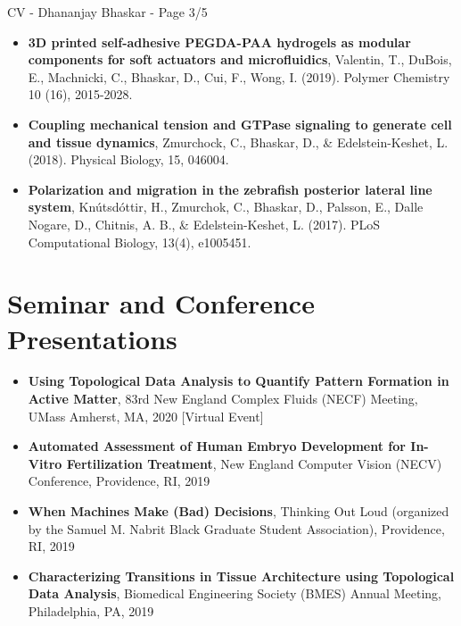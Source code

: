 \documentclass[margin,line]{res}
\begin{document}
\begin{resume}
\newpage
\begin{flushright}
CV - Dhananjay Bhaskar - Page 3/5
\end{flushright}
\vspace*{.2cm}

{\renewcommand\leftmargini{0em}
\begin{itemize}
\item{\bf 3D printed self-adhesive PEGDA-PAA hydrogels as modular components for soft actuators and microfluidics}, Valentin, T., DuBois, E., Machnicki, C., Bhaskar, D., Cui, F., Wong, I. (2019). Polymer Chemistry 10 (16), 2015-2028.
\vspace*{.1cm}
\item {\bf Coupling mechanical tension and GTPase signaling to generate cell and tissue dynamics}, Zmurchock, C., Bhaskar, D., \& Edelstein-Keshet, L. (2018). Physical Biology, 15, 046004.
\vspace*{.1cm}
\item{\bf Polarization and migration in the zebrafish posterior lateral line system}, Kn\'{u}tsd\'{o}ttir, H., Zmurchok, C., Bhaskar, D., Palsson, E., Dalle Nogare, D., Chitnis, A. B., \& Edelstein-Keshet, L. (2017). PLoS Computational Biology, 13(4), e1005451.
\end{itemize}
}

\vspace*{.3cm}

\section{\sc Seminar and Conference Presentations}

{\renewcommand\leftmargini{0em}
\begin{itemize}
\item {\bf Using Topological Data Analysis to Quantify Pattern Formation in Active Matter}, 83rd New England Complex Fluids (NECF) Meeting, UMass Amherst, MA, 2020 [Virtual Event]

\item {\bf Automated Assessment of Human Embryo Development for In-Vitro Fertilization Treatment}, New England Computer Vision (NECV) Conference, Providence, RI, 2019

\item {\bf When Machines Make (Bad) Decisions}, Thinking Out Loud (organized by the Samuel M. Nabrit Black Graduate Student Association), Providence, RI, 2019

\item {\bf Characterizing Transitions in Tissue Architecture using Topological Data Analysis}, Biomedical Engineering Society (BMES) Annual Meeting, Philadelphia, PA, 2019


\end{itemize}}
\end{resume}
\end{document}

